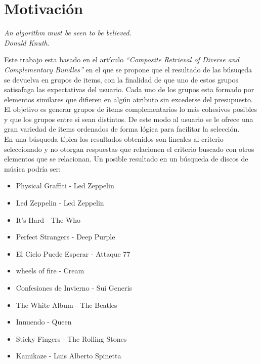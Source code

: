 \section{Motivación}
{\begin{small}%
\begin{flushright}%
\it An algorithm must be seen to be believed.\\Donald Knuth.
\end{flushright}%
\end{small}%
\vspace{.5cm}}
Este trabajo esta basado en el artículo \textit{\textquotedblleft Composite Retrieval of Diverse 
and Complementary Bundles\textquotedblright}\cite{compositeRetrival} en el que se propone 
que el resultado de las búsuqeda se devuelva en grupos de items, con la finalidad de que uno de estos grupos satisafaga
las expectativas del usuario. Cada uno de los grupos esta formado por elementos similares que difieren en algún atributo sin excederse del presupuesto.
El objetivo es generar grupos de items complementarios lo más cohesivos posibles y que los grupos entre si sean distintos.
De este modo al usuario se le ofrece una gran variedad de items ordenados de forma lógica para facilitar la selección.\\

En una búsqueda típica los resultados obtenidos son lineales al criterio seleccionado y no otorgan respuestas que relacionen 
el criterio buscado con otros elementos que se relacionan. Un posible resultado en un búsqueda de discos de música podría ser:\\
\begin{itemize}
  \item Physical Graffiti - Led Zeppelin
  \item Led Zeppelin - Led Zeppelin
  \item It's Hard - The Who
  \item Perfect Strangers - Deep Purple
  \item El Cielo Puede Esperar - Attaque 77
  \item wheels of fire - Cream
  \item Confesiones de Invierno - Sui Generis
  \item The White Album - The Beatles
  \item Innuendo - Queen
  \item Sticky Fingers - The Rolling Stones
  \item Kamikaze - Luis Alberto Spinetta
\end{itemize}


